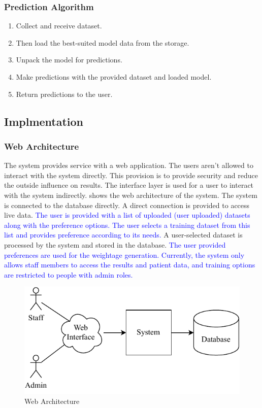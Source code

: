 \documentclass[a4paper,fleqn]{cas-dc}
\newcommand{\responsemodsm}[1]{\textcolor{blue}{#1}}
\begin{document}
\vspace{-0.5em}
\subsubsection*{Prediction Algorithm}\label{subsubsec:prediction_algorithm}
\vspace{0.5em}
\begin{enumerate}
    \item Collect and receive dataset.
    \item Then load the best-suited model data from the storage.
    \item Unpack the model for predictions.
    \item Make predictions with the provided dataset and loaded model.
    \item Return predictions to the user.
\end{enumerate}

\subsection{Implmentation}\label{subsec:implmentation}

\subsubsection{Web Architecture}\label{subsubsec:web_architecture}

The system provides service with a web application. The users aren't allowed to interact with the system directly. This provision is to provide security and reduce the outside influence on results. The interface layer is used for a user to interact with the system indirectly.  shows the web architecture of the system. The system is connected to the database directly. A direct connection is provided to access live data. \responsemodsm{The user is provided with a list of uploaded (user uploaded) datasets along with the preference options. The user selects a training dataset from this list and provides preference according to its needs.} A user-selected dataset is processed by the system and stored in the database. \responsemodsm{The user provided preferences are used for the weightage generation. Currently, the system only allows staff members to access the results and patient data, and training options are restricted to people with admin roles.}

\begin{figure}[ht]
    \centering
    \includegraphics[width=0.9\columnwidth]{web_architecture.pdf}
    \caption{Web Architecture}
    \label{fig:web_architecture}
\end{figure}
\end{document}

